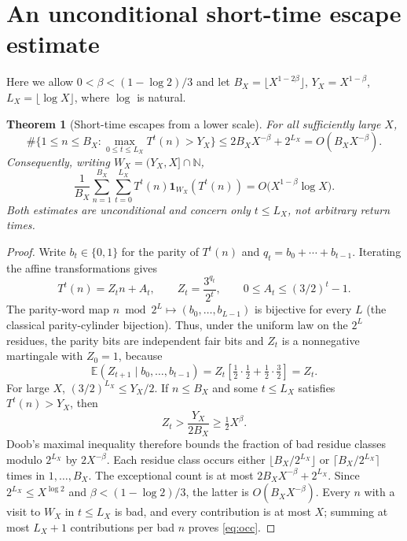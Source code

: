 \documentclass[11pt]{amsart}
\newtheorem{theorem}{Theorem}
\theoremstyle{remark}\newtheorem{remark}{Remark}
\newcommand{\N}{\mathbb N}
\newcommand{\one}{\mathbf 1}
\begin{document}
\section{An unconditional short-time escape estimate}
Here we allow $0<\beta<(1-\log 2)/3$ and let $B_X=\lfloor X^{1-2\beta}\rfloor$, $Y_X=X^{1-\beta}$, $L_X=\lfloor\log X\rfloor$, where $\log$ is natural.
\begin{theorem}[Short-time escapes from a lower scale]\label{thm:short}
For all sufficiently large $X$,
\begin{equation}\label{eq:bad}
 \#\{1\le n\le B_X:\max_{0\le t\le L_X}T^t(n)>Y_X\}
 \le 2B_X X^{-\beta}+2^{L_X}=O(B_X X^{-\beta}).
\end{equation}
Consequently, writing $W_X=(Y_X,X]\cap\N$,
\begin{equation}\label{eq:occ}
 \frac1{B_X}\sum_{n=1}^{B_X}\sum_{t=0}^{L_X}T^t(n)\one_{W_X}(T^t(n))
 =O\bigl(X^{1-\beta}\log X\bigr).
\end{equation}
Both estimates are unconditional and concern only $t\le L_X$, not arbitrary return times.
\end{theorem}
\begin{proof}
Write $b_t\in\{0,1\}$ for the parity of $T^t(n)$ and $q_t=b_0+\cdots+b_{t-1}$.  Iterating the affine transformations gives
\[
 T^t(n)=Z_tn+A_t,\qquad Z_t=\frac{3^{q_t}}{2^t},\qquad 0\le A_t\le(3/2)^t-1.
\]
The parity-word map $n\bmod 2^L\mapsto (b_0,\ldots,b_{L-1})$ is bijective for every $L$ (the classical parity-cylinder bijection).  Thus, under the uniform law on the $2^L$ residues, the parity bits are independent fair bits and $Z_t$ is a nonnegative martingale with $Z_0=1$, because
\[
 \mathbb E(Z_{t+1}\mid b_0,\ldots,b_{t-1})
 = Z_t\left[\tfrac12\cdot\tfrac12+\tfrac12\cdot\tfrac32\right]=Z_t.
\]
For large $X$, $(3/2)^{L_X}\le Y_X/2$.  If $n\le B_X$ and some $t\le L_X$ satisfies $T^t(n)>Y_X$, then
\[
 Z_t>\frac{Y_X}{2B_X}\ge\tfrac12 X^{\beta}.
\]
Doob's maximal inequality therefore bounds the fraction of bad residue classes modulo $2^{L_X}$ by $2X^{-\beta}$.  Each residue class occurs either $\lfloor B_X/2^{L_X}\rfloor$ or $\lceil B_X/2^{L_X}\rceil$ times in $1,\ldots,B_X$.  The exceptional count is at most $2B_X X^{-\beta}+2^{L_X}$.  Since $2^{L_X}\le X^{\log2}$ and $\beta<(1-\log2)/3$, the latter is $O(B_X X^{-\beta})$.  Every $n$ with a visit to $W_X$ in $t\le L_X$ is bad, and every contribution is at most $X$; summing at most $L_X+1$ contributions per bad $n$ proves \eqref{eq:occ}.
\end{proof}
\end{document}
